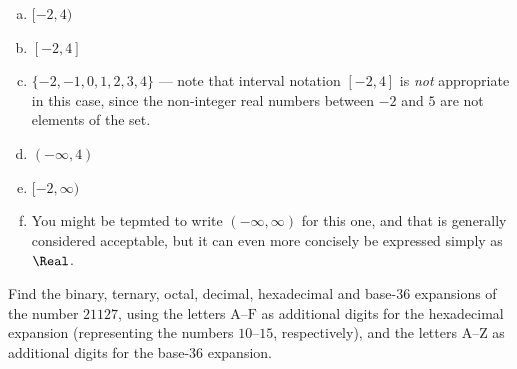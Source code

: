 \begin{solutions*}
\fixlistskip%
\begin{enumerate}[(a)]
\item $[{-2},4)$
\item $[{-2},4]$
\item $\{ {-2}, {-1}, 0, 1, 2, 3, 4 \}$ --- note that interval notation $[{-2},4]$ is \textit{not} appropriate in this case, since the non-integer real numbers between $-2$ and $5$ are not elements of the set.
\item $({-\infty},4)$
\item $[{-2},\infty)$
\item You might be tepmted to write $({-\infty},\infty)$ for this one, and that is generally considered acceptable, but it can even more concisely be expressed simply as $\Real$.
\end{enumerate}
\end{solutions*}


\begin{exercise}
Find the binary, ternary, octal, decimal, hexadecimal and base-$36$ expansions of the number $21127$, using the letters $\mathrm{A}$--$\mathrm{F}$ as additional digits for the hexadecimal expansion (representing the numbers $10$--$15$, respectively), and the letters $\mathrm{A}$--$\mathrm{Z}$ as additional digits for the base-$36$ expansion.
\end{exercise}

